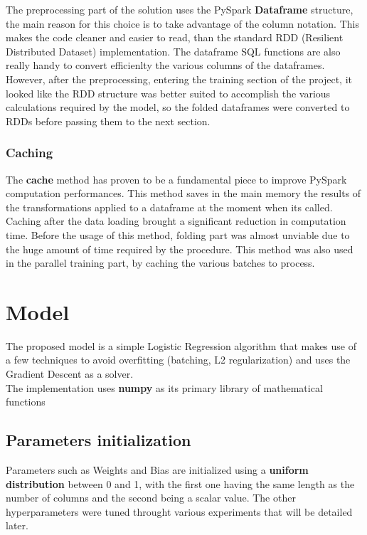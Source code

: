 \documentclass[
	letterpaper, %
	10pt, %
]{class}
\begin{document}
The preprocessing part of the solution uses the PySpark \textbf{Dataframe} structure, the main reason for this choice is to take advantage of the column notation. This makes the code cleaner and easier to read, than the standard RDD (Resilient Distributed Dataset) implementation. The dataframe SQL functions are also really handy to convert efficienlty the various columns of the dataframes.
However, after the preprocessing, entering the training section of the project, it looked like the RDD structure was better suited to accomplish the various calculations required by the model, so the folded dataframes were converted to RDDs before passing them to the next section.

\subsubsection{Caching}

The \textbf{cache} method has proven to be a fundamental piece to improve PySpark computation performances. This method saves in the main memory the results of the transformations applied to a dataframe at the moment when its called. Caching after the data loading brought a significant reduction in computation time. Before the usage of this method, folding part was almost unviable due to the huge amount of time required by the procedure.
This method was also used in the parallel training part, by caching the various batches to process.



\section{Model}

The proposed model is a simple Logistic Regression \cite{logistic} algorithm that makes use of a few techniques to avoid overfitting (batching, L2 regularization) and uses the Gradient Descent as a solver.\\
The implementation uses \textbf{numpy} \cite{numpy} as its primary library of mathematical functions

\subsection{Parameters initialization}
Parameters such as Weights and Bias are initialized using a \textbf{uniform distribution} between 0 and 1, with the first one having the same length as the number of columns and the second being a scalar value.
The other hyperparameters were tuned throught various experiments that will be detailed later.
\end{document}
